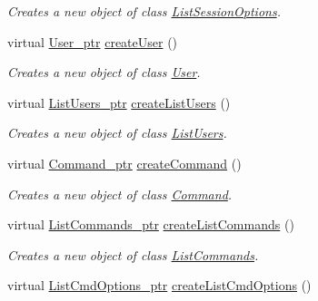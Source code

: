 \begin{DoxyCompactItemize}
\begin{DoxyCompactList}\small\item\em Creates a new object of class \hyperlink{classUMS__Data_1_1ListSessionOptions}{ListSessionOptions}. \item\end{DoxyCompactList}\item 
virtual \hyperlink{classUMS__Data_1_1User}{User\_\-ptr} \hyperlink{classUMS__Data_1_1UMS__DataFactory_ac20ad6f212f1c6866fb1f073e154a9e5}{createUser} ()
\begin{DoxyCompactList}\small\item\em Creates a new object of class \hyperlink{classUMS__Data_1_1User}{User}. \item\end{DoxyCompactList}\item 
virtual \hyperlink{classUMS__Data_1_1ListUsers}{ListUsers\_\-ptr} \hyperlink{classUMS__Data_1_1UMS__DataFactory_a081b529c5a65a6b8a775d590c7426c09}{createListUsers} ()
\begin{DoxyCompactList}\small\item\em Creates a new object of class \hyperlink{classUMS__Data_1_1ListUsers}{ListUsers}. \item\end{DoxyCompactList}\item 
virtual \hyperlink{classUMS__Data_1_1Command}{Command\_\-ptr} \hyperlink{classUMS__Data_1_1UMS__DataFactory_adbe80d23ccacabaa4fa7242a6c8cbb9a}{createCommand} ()
\begin{DoxyCompactList}\small\item\em Creates a new object of class \hyperlink{classUMS__Data_1_1Command}{Command}. \item\end{DoxyCompactList}\item 
virtual \hyperlink{classUMS__Data_1_1ListCommands}{ListCommands\_\-ptr} \hyperlink{classUMS__Data_1_1UMS__DataFactory_a15a503099acfe39936dd2ab8ccee3b2b}{createListCommands} ()
\begin{DoxyCompactList}\small\item\em Creates a new object of class \hyperlink{classUMS__Data_1_1ListCommands}{ListCommands}. \item\end{DoxyCompactList}\item 
virtual \hyperlink{classUMS__Data_1_1ListCmdOptions}{ListCmdOptions\_\-ptr} \hyperlink{classUMS__Data_1_1UMS__DataFactory_a6bb527b1291e5751188bf8452c261b61}{createListCmdOptions} ()

\end{DoxyCompactItemize}
